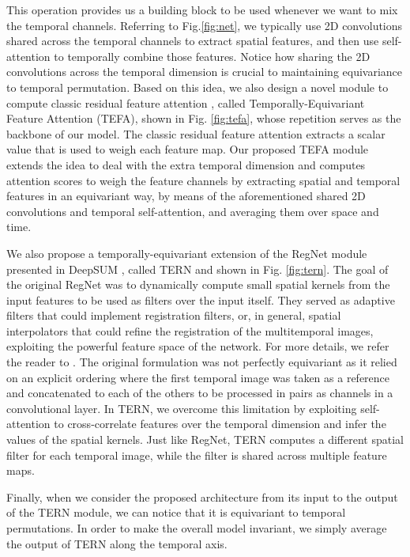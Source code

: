 \documentclass[journal]{IEEEtran}
\begin{document}
This operation provides us a building block to be used whenever we want to mix the temporal channels. Referring to Fig.\ref{fig:net}, we typically use 2D convolutions shared across the temporal channels to extract spatial features, and then use self-attention to temporally combine those features. Notice how sharing the 2D convolutions across the temporal dimension is crucial to maintaining equivariance to temporal permutation. Based on this idea, we also design a novel module to compute classic residual feature attention \cite{zhang2018image}, called Temporally-Equivariant Feature Attention (TEFA), shown in Fig. \ref{fig:tefa}, whose repetition serves as the backbone of our model. The classic residual feature attention \cite{zhang2018image} extracts a scalar value that is used to weigh each feature map. Our proposed TEFA module extends the idea to deal with the extra temporal dimension and computes attention scores to weigh the feature channels by extracting spatial and temporal features in an equivariant way, by means of the aforementioned shared 2D convolutions and temporal self-attention, and averaging them over space and time.

We also propose a temporally-equivariant extension of the RegNet module presented in DeepSUM \cite{molini2019deepsum}, called TERN and shown in Fig. \ref{fig:tern}. The goal of the original RegNet was to dynamically compute small  spatial kernels from the input features to be used as filters over the input itself. They served as adaptive filters that could implement registration filters, or, in general, spatial interpolators that could refine the registration of the multitemporal images, exploiting the powerful feature space of the network. For more details, we refer the reader to \cite{molini2019deepsum}. The original formulation was not perfectly equivariant as it relied on an explicit ordering where the first temporal image was taken as a reference and concatenated to each of the others to be processed in pairs as channels in a convolutional layer. In TERN, we overcome this limitation by exploiting self-attention to cross-correlate features over the temporal dimension and infer the values of the spatial kernels. Just like RegNet, TERN computes a different  spatial filter for each temporal image, while the filter is shared across multiple feature maps.

Finally, when we consider the proposed architecture from its input to the output of the TERN module, we can notice that it is equivariant to temporal permutations. In order to make the overall model invariant, we simply average the output of TERN along the temporal axis.
\end{document}
